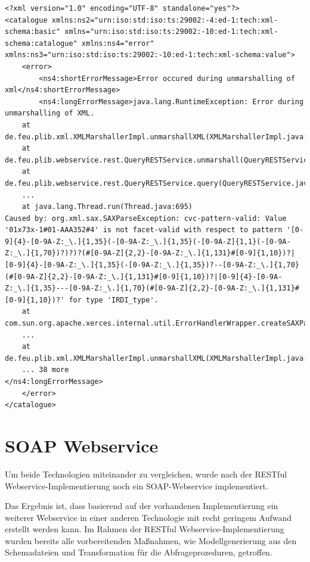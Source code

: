  \begin{lstlisting}[caption=Fehlerbehandlung - Beispielantwort mit Validierungsfehler=xml, label=lst:error_catalogue_beispiel]
<?xml version="1.0" encoding="UTF-8" standalone="yes"?>
<catalogue xmlns:ns2="urn:iso:std:iso:ts:29002:-4:ed-1:tech:xml-schema:basic" xmlns="urn:iso:std:iso:ts:29002:-10:ed-1:tech:xml-schema:catalogue" xmlns:ns4="error" xmlns:ns3="urn:iso:std:iso:ts:29002:-10:ed-1:tech:xml-schema:value">
    <error>
        <ns4:shortErrorMessage>Error occured during unmarshalling of xml</ns4:shortErrorMessage>
        <ns4:longErrorMessage>java.lang.RuntimeException: Error during unmarshalling of XML.
	at de.feu.plib.xml.XMLMarshallerImpl.unmarshallXML(XMLMarshallerImpl.java:63)
	at de.feu.plib.webservice.rest.QueryRESTService.unmarshall(QueryRESTService.java:151)
	at de.feu.plib.webservice.rest.QueryRESTService.query(QueryRESTService.java:91)
	...
	at java.lang.Thread.run(Thread.java:695)
Caused by: org.xml.sax.SAXParseException: cvc-pattern-valid: Value '01x73x-1#01-AAA352#4' is not facet-valid with respect to pattern '[0-9]{4}-[0-9A-Z:_\.]{1,35}(-[0-9A-Z:_\.]{1,35}(-[0-9A-Z]{1,1}(-[0-9A-Z:_\.]{1,70})?)?)?(#[0-9A-Z]{2,2}-[0-9A-Z:_\.]{1,131}#[0-9]{1,10})?|[0-9]{4}-[0-9A-Z:_\.]{1,35}(-[0-9A-Z:_\.]{1,35})?--[0-9A-Z:_\.]{1,70}(#[0-9A-Z]{2,2}-[0-9A-Z:_\.]{1,131}#[0-9]{1,10})?|[0-9]{4}-[0-9A-Z:_\.]{1,35}---[0-9A-Z:_\.]{1,70}(#[0-9A-Z]{2,2}-[0-9A-Z:_\.]{1,131}#[0-9]{1,10})?' for type 'IRDI_type'.
	at com.sun.org.apache.xerces.internal.util.ErrorHandlerWrapper.createSAXParseException(ErrorHandlerWrapper.java:195)
	...
	at de.feu.plib.xml.XMLMarshallerImpl.unmarshallXML(XMLMarshallerImpl.java:57)
	... 38 more
</ns4:longErrorMessage>
    </error>
</catalogue>
\end{lstlisting} 

\section{SOAP Webservice}

Um beide Technologien miteinander zu vergleichen, wurde nach der \gls{REST}ful \gls{Webservice}-Implementierung noch ein \gls{SOAP}-\gls{Webservice} implementiert. 

Das Ergebnis ist, dass basierend auf der vorhandenen Implementierung ein weiterer Webservice in einer anderen Technologie mit recht geringem Aufwand erstellt werden kann. Im Rahmen der \gls{REST}ful \gls{Webservice}-Implementierung wurden bereits alle vorbereitenden Maßnahmen, wie Modellgenerierung aus den Schemadateien und Transformation für die Abfrageprozeduren, getroffen. 
 
